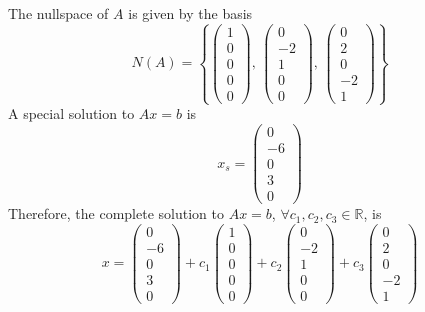 \documentclass{article}
\begin{document}
The nullspace of $ A $ is given by the basis
$$ N(A) = \left\{ \begin{pmatrix}
    1 \\
    0 \\
    0 \\
    0 \\
    0
\end{pmatrix},\, \begin{pmatrix}
    0 \\
    -2 \\
    1 \\
    0 \\
    0
\end{pmatrix},\, \begin{pmatrix}
    0 \\
    2 \\
    0 \\
    -2 \\
    1
\end{pmatrix} \right\} $$
A special solution to $ Ax = b $ is
$$ x_s = \begin{pmatrix}
    0 \\
    -6 \\
    0 \\
    3 \\
    0
\end{pmatrix} $$
Therefore, the complete solution to $ Ax = b $, $ \forall c_1, c_2, c_3 \in
\mathbb{R} $, is
$$ x = \begin{pmatrix}
    0 \\
    -6 \\
    0 \\
    3 \\
    0
\end{pmatrix} + c_1 \begin{pmatrix}
    1 \\
    0 \\
    0 \\
    0 \\
    0
\end{pmatrix} + c_2 \begin{pmatrix}
    0 \\
    -2 \\
    1 \\
    0 \\
    0
\end{pmatrix} + c_3 \begin{pmatrix}
    0 \\
    2 \\
    0 \\
    -2 \\
    1
\end{pmatrix} $$
\end{document}
